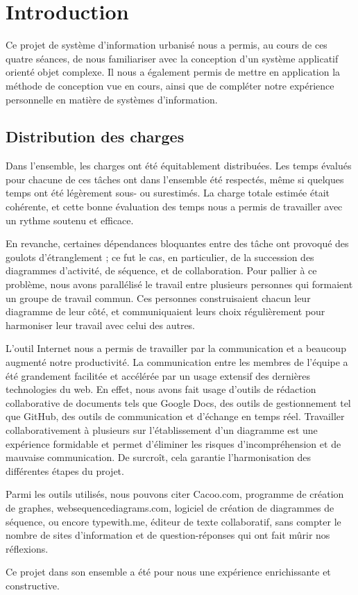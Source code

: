 
\section{Introduction}

Ce projet de système d'information urbanisé nous a permis, au cours de ces quatre séances, de nous familiariser avec la conception d'un système applicatif orienté objet complexe. Il nous a également permis de mettre en application la méthode de conception vue en cours, ainsi que de compléter notre expérience personnelle en matière de systèmes d'information.

\subsection{Distribution des charges}

Dans l'ensemble, les charges ont été équitablement distribuées. Les temps évalués pour chacune de ces tâches ont dans l'ensemble été respectés, même si quelques temps ont été légèrement sous- ou surestimés. La charge totale estimée était cohérente, et cette bonne évaluation des temps nous a permis de travailler avec un rythme soutenu et efficace.

En revanche, certaines dépendances bloquantes entre des tâche ont provoqué des goulots d'étranglement ; ce fut le cas, en particulier, de la succession des diagrammes d'activité, de séquence, et de collaboration. Pour pallier à ce problème, nous avons parallélisé le travail entre plusieurs personnes qui formaient un groupe de travail commun. Ces personnes construisaient chacun leur diagramme de leur côté, et communiquaient leurs choix régulièrement pour harmoniser leur travail avec celui des autres.

L'outil Internet nous a permis de travailler par la communication et a beaucoup augmenté notre productivité. La communication entre les membres de l'équipe a été grandement facilitée et accélérée par un usage extensif des dernières technologies du web. En effet, nous avons fait usage d'outils de rédaction collaborative de documents tels que Google Docs, des outils de gestionnement tel que GitHub, des outils de communication et d'échange en temps réel. Travailler collaborativement à plusieurs sur l'établissement d'un diagramme est une expérience formidable et permet d'éliminer les risques d'incompréhension et de mauvaise communication. De surcroît, cela garantie l'harmonisation des différentes étapes du projet.

Parmi les outils utilisés, nous pouvons citer Cacoo.com, programme de création de graphes, websequencediagrams.com, logiciel de création de diagrammes de séquence, ou encore typewith.me, éditeur de texte collaboratif, sans compter le nombre de sites d'information et de question-réponses qui ont fait mûrir nos réflexions.

Ce projet dans son ensemble a été pour nous une expérience enrichissante et constructive.
